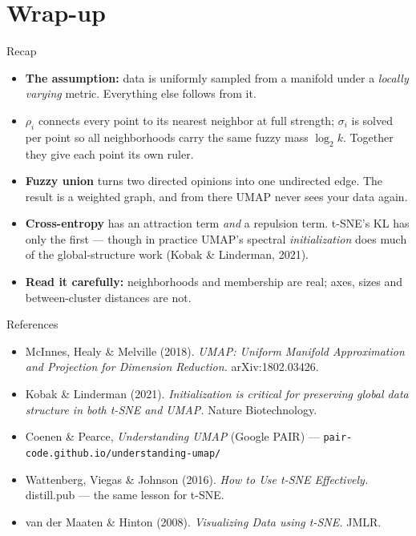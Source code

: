 \documentclass[aspectratio=169]{beamer}
\begin{document}
\section*{Wrap-up}

\begin{frame}{Recap}
  \begin{itemize}\small
    \item \textbf{The assumption:} data is uniformly sampled from a manifold under a
      \emph{locally varying} metric. Everything else follows from it.
    \item \textbf{$\rho_i$} connects every point to its nearest neighbor at full strength;
      \textbf{$\sigma_i$} is solved per point so all neighborhoods carry the same fuzzy mass
      $\log_2 k$. Together they give each point its own ruler.
    \item \textbf{Fuzzy union} turns two directed opinions into one undirected edge. The result
      is a weighted graph, and from there UMAP never sees your data again.
    \item \textbf{Cross-entropy} has an attraction term \emph{and} a repulsion term. t-SNE's KL
      has only the first --- though in practice UMAP's spectral \emph{initialization} does much
      of the global-structure work (Kobak \& Linderman, 2021).
    \item \textbf{Read it carefully:} neighborhoods and membership are real; axes, sizes and
      between-cluster distances are not.
  \end{itemize}
  \vfill
\end{frame}

\begin{frame}{References}
  \begin{itemize}\small
    \item McInnes, Healy \& Melville (2018). \emph{UMAP: Uniform Manifold Approximation and
      Projection for Dimension Reduction.} arXiv:1802.03426.
    \item Kobak \& Linderman (2021). \emph{Initialization is critical for preserving global
      data structure in both t-SNE and UMAP.} Nature Biotechnology.
    \item Coenen \& Pearce, \emph{Understanding UMAP} (Google PAIR) ---
      \texttt{pair-code.github.io/understanding-umap/}
    \item Wattenberg, Viegas \& Johnson (2016). \emph{How to Use t-SNE Effectively.}
      distill.pub --- the same lesson for t-SNE.
    \item van der Maaten \& Hinton (2008). \emph{Visualizing Data using t-SNE.} JMLR.
  \end{itemize}
\end{frame}
\end{document}
